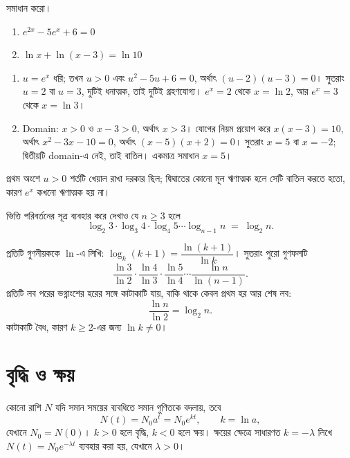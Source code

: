 \documentclass[11pt]{article}
\begin{document}
 সমাধান করো।
\begin{enumerate}
  \item $e^{2x} - 5e^{x} + 6 = 0$
  \item $\ln x + \ln (x-3) = \ln 10$
\end{enumerate}

\begin{sol}
\begin{enumerate}
  \item $u = e^{x}$ ধরি; তখন $u > 0$ এবং $u^{2} - 5u + 6 = 0$, অর্থাৎ
        $(u-2)(u-3) = 0$। সুতরাং $u = 2$ বা $u = 3$, দুটিই ধনাত্মক, তাই দুটিই
        গ্রহণযোগ্য। $e^{x} = 2$ থেকে $x = \ln 2$, আর $e^{x} = 3$ থেকে
        $x = \ln 3$।
  \item Domain: $x > 0$ ও $x - 3 > 0$, অর্থাৎ $x > 3$। যোগের নিয়ম প্রয়োগ করে
        $x(x-3) = 10$, অর্থাৎ $x^{2} - 3x - 10 = 0$, অর্থাৎ $(x-5)(x+2) = 0$।
        সুতরাং $x = 5$ বা $x = -2$; দ্বিতীয়টি domain-এ নেই, তাই বাতিল।
        একমাত্র সমাধান $x = 5$।
\end{enumerate}
প্রথম অংশে $u > 0$ শর্তটি খেয়াল রাখা দরকার ছিল; দ্বিঘাতের কোনো মূল ঋণাত্মক
হলে সেটি বাতিল করতে হতো, কারণ $e^{x}$ কখনো ঋণাত্মক হয় না।
\end{sol}

 ভিত্তি পরিবর্তনের সূত্র ব্যবহার করে দেখাও যে $n \geq 3$ হলে
\[
  \log_{2} 3 \cdot \log_{3} 4 \cdot \log_{4} 5 \cdots \log_{n-1} n
  \;=\; \log_{2} n .
\]

\begin{sol}
প্রতিটি গুণনীয়ককে $\ln$-এ লিখি: $\log_{k} (k+1) = \dfrac{\ln (k+1)}{\ln k}$।
সুতরাং পুরো গুণফলটি
\[
  \frac{\ln 3}{\ln 2} \cdot \frac{\ln 4}{\ln 3} \cdot \frac{\ln 5}{\ln 4}
  \cdots \frac{\ln n}{\ln (n-1)} .
\]
প্রতিটি লব পরের ভগ্নাংশের হরের সঙ্গে কাটাকাটি যায়, বাকি থাকে কেবল প্রথম হর
আর শেষ লব:
\[
  \frac{\ln n}{\ln 2} = \log_{2} n .
\]
কাটাকাটি বৈধ, কারণ $k \geq 2$-এর জন্য $\ln k \neq 0$।
\end{sol}

\section{বৃদ্ধি ও ক্ষয়}

\begin{idea}[সূচকীয় বৃদ্ধি ও ক্ষয়]
কোনো রাশি $N$ যদি সমান সময়ের ব্যবধিতে সমান গুণিতকে বদলায়, তবে
\[
  N(t) = N_{0} a^{t} = N_{0} e^{kt}, \qquad k = \ln a ,
\]
যেখানে $N_{0} = N(0)$। $k > 0$ হলে বৃদ্ধি, $k < 0$ হলে ক্ষয়। ক্ষয়ের ক্ষেত্রে
সাধারণত $k = -\lambda$ লিখে $N(t) = N_{0} e^{-\lambda t}$ ব্যবহার করা হয়,
যেখানে $\lambda > 0$।
\end{idea}
\end{document}
